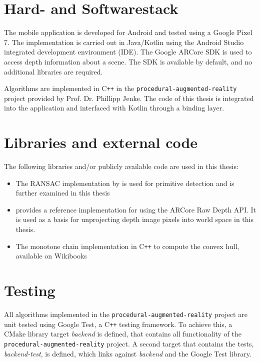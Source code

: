 \section{Hard- and Softwarestack}

The mobile application is developed for Android and tested using a Google Pixel 7.
The implementation is carried out in Java/Kotlin using the Android Studio integrated development environment (IDE).
The Google ARCore SDK is used to access depth information about a scene.
The SDK is available by default, and no additional libraries are required.

Algorithms are implemented in C\texttt{++} in the \texttt{procedural-augmented-reality} project provided by Prof. Dr. Phillipp Jenke.
The code of this thesis is integrated into the application and interfaced with Kotlin through a binding layer.

\section{Libraries and external code}
The following libraries and/or publicly available code are used in this thesis:
\begin{itemize}
    \item The RANSAC implementation by \citeauthor{schnabel_efficient_2007} is used for primitive detection
    and is further examined in this thesis \parencite{schnabel_efficient_2007}
    \item {} provides a reference implementation for using the ARCore Raw Depth API\@.
    It is used as a basis for unprojecting depth image pixels into world space in this thesis.~\parencite{google_llc_codelab_raw_depth}
    \item The monotone chain implementation in C\texttt{++} to compute the convex hull, available on Wikibooks~
\end{itemize}

\section{Testing}

All algorithms implemented in the \texttt{procedural-augmented-reality} project are unit tested using
Google Test, a C\texttt{++} testing framework.
To achieve this, a CMake library target \textit{backend} is defined,
that contains all functionality of the \texttt{procedural-augmented-reality} project.
A second target that contains the tests, \textit{backend-test}, is defined,
which links against \textit{backend} and the Google Test library.